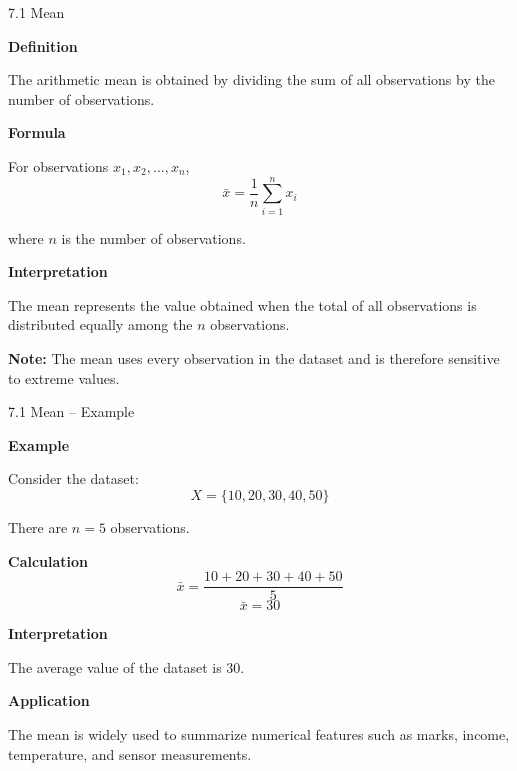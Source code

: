 \begin{frame}{7.1 Mean}

\textbf{Definition}

The arithmetic mean is obtained by dividing the sum of all
observations by the number of observations.

\textbf{Formula}

For observations $x_1,x_2,\ldots,x_n$,
\[
\boxed{
\bar{x} = \frac{1}{n}\sum_{i=1}^{n}x_i
}
\]

where $n$ is the number of observations.

\textbf{Interpretation}

The mean represents the value obtained when the total of all
observations is distributed equally among the $n$ observations.

\textbf{Note:} The mean uses every observation in the dataset and
is therefore sensitive to extreme values.

\end{frame}



\begin{frame}{7.1 Mean -- Example}

\textbf{Example}

Consider the dataset:
\[
X=\{10,20,30,40,50\}
\]

There are $n=5$ observations.

\textbf{Calculation}
\[
\bar{x}
=
\frac{10+20+30+40+50}{5}
\]
\[
\boxed{\bar{x}=30}
\]

\textbf{Interpretation}

The average value of the dataset is $30$.

\textbf{Application}

The mean is widely used to summarize numerical features such as
marks, income, temperature, and sensor measurements.

\end{frame}



